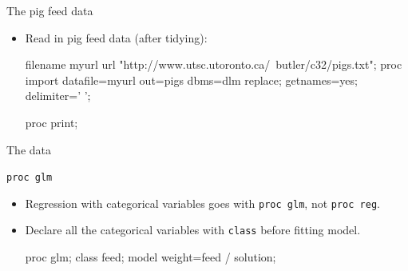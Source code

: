 \documentclass[unknownkeysallowed]{beamer}\usepackage[]{graphicx}\usepackage[]{color}
\begin{document}

\begin{frame}[fragile]{The pig feed data}
  
  \begin{itemize}
  \item Read in pig feed data (after tidying):
    
    \begin{Sascode}[store=muber]
filename myurl url 
  "http://www.utsc.utoronto.ca/~butler/c32/pigs.txt";
proc import
  datafile=myurl
  out=pigs
  dbms=dlm
  replace;
  getnames=yes;
  delimiter=' ';
  
proc print;
    \end{Sascode}
  \end{itemize}
  
\end{frame}

\begin{frame}[fragile]{The data}
  
\end{frame}

\begin{frame}[fragile]{\texttt{proc glm}}
  
  \begin{itemize}
  \item Regression with categorical variables goes with \texttt{proc
      glm}, not \texttt{proc reg}.
  \item Declare all the categorical variables with \texttt{class}
    before fitting model.
    
    \begin{Sascode}[store=kogep]
proc glm;
  class feed;
  model weight=feed / solution;
    \end{Sascode}
  \end{itemize}
\end{frame}
\end{document}
